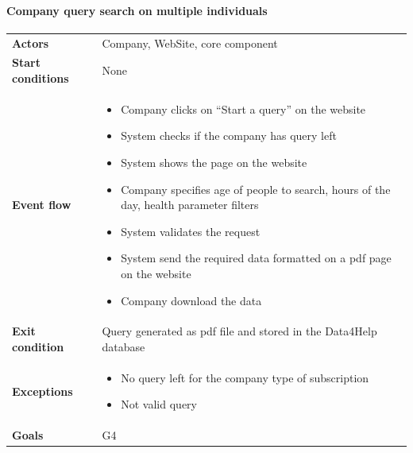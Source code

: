 \paragraph{Company query search on multiple individuals}
\begin{center}
\begin{table}[H]
\centering
\begin{tabular}{l|p{}}
\textbf{Actors} &
Company, WebSite, core component
 \\
\textbf{Start conditions} & None \\
\textbf{Event flow}  &  \begin{minipage}[t]{0.7\textwidth}
    \begin{itemize}
        \item Company clicks on “Start a query” on the website


        \item System checks if the company has query left

        \item System shows the page on the website
        \item Company specifies age of people to search, hours of the day, health parameter filters
 
        \item System validates the request
        \item System send the required data formatted on a pdf page on the website
        \item Company download the data

    \end{itemize}
    
\end{minipage} \\
\textbf{Exit condition} & Query generated as pdf file and stored in the Data4Help database \\
\textbf{Exceptions} & \begin{minipage}[t]{0.7\textwidth}
    \begin{itemize}
        \item No query left for the company type of subscription
        \item Not valid query
    \end{itemize}
    
\end{minipage} \\
\textbf{Goals} & G4
\end{tabular}

\end{table}
\end{center}

